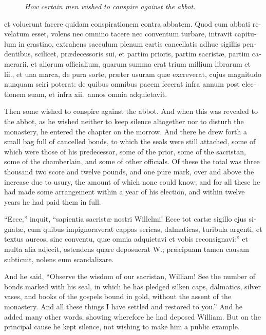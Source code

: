 \documentclass{book}
\newcommand{\blockhead}[4][]{
\begin{figure}
\centering
\vspace{#4}
\parbox{2.75cm}{\begin{center}\footnotesize \color{BrickRed} \emph{#2}\\ #1 \end{center}}
\end{figure}
}
\begin{document}
\begin{paracol}{2}
\begin{otherlanguage}{latin}
\blockhead{How certain men wished to conspire against the abbot.}{3}{-0.55cm}
et voluerunt facere quidam conspirationem contra abbatem. Quod cum abbati revelatum esset, volens nec omnino tacere nec conventum turbare, intravit capitulum in crastino, extrahens sacculum plenum cartis cancellatis adhuc sigillis pendentibus, scilicet, pr\ae{}decessoris sui, et partim prioris, partim sacrist\ae{}, partim camerarii, et aliorum officialium, quarum summa erat trium millium librarum et lii., et una marca, de pura sorte, pr\ae{}ter usuram qu\ae{} excreverat, cujus magnitudo nunquam sciri poterat: de quibus omnibus pacem fecerat infra annum post electionem suam, et infra xii.\ annos omnia adquietavit.

\end{otherlanguage}

\switchcolumn

Then some wished to conspire against the abbot. And when this was revealed to the abbot, as he wished neither to keep silence altogether nor to disturb the monastery, he entered the chapter on the morrow. And there he drew forth a small bag full of cancelled bonds, to which the seals were still attached, some of which were those of his predecessor, some of the prior, some of the sacristan, some of the chamberlain, and some of other officials. Of these the total was three thousand two score and twelve pounds, and one pure mark, over and above the increase due to usury, the amount of which none could know; and for all these he had made some arrangement within a year of his election, and within twelve years he had paid them in full.

\switchcolumn*

\begin{otherlanguage}{latin}
``Ecce,'' inquit, ``sapientia sacrist\ae{} nostri Willelmi! Ecce tot cart\ae{} sigillo ejus signat\ae{}, cum quibus impignoraverat cappas sericas, dalmaticas, turibula argenti, et textus aureos, sine conventu, qu\ae{} omnia adquietavi et vobis reconsignavi:'' et multa alia adjecit, ostendens quare deposuerat W.; pr\ae{}cipuam tamen causam subticuit, nolens eum scandalizare.
\end{otherlanguage}

\switchcolumn

And he said, ``Observe the wisdom of our sacristan, William! See the number of bonds marked with his seal, in which he has pledged silken caps, dalmatics, silver vases, and books of the gospels bound in gold, without the assent of the monastery. And all these things I have settled and restored to you.'' And he added many other words, showing wherefore he had deposed William. But on the principal cause he kept silence, not wishing to make him a public example.


\end{paracol}
\end{document}
